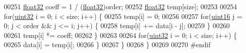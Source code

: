 \begin{DoxyCode}
00251         \hyperlink{definitions_8hpp_aacdc525d6f7bddb3ae95d5c311bd06a1}{float32} coeff = 1 / (\hyperlink{definitions_8hpp_aacdc525d6f7bddb3ae95d5c311bd06a1}{float32})order;
00252         \hyperlink{definitions_8hpp_aacdc525d6f7bddb3ae95d5c311bd06a1}{float32} temp[size];
00253 
00254         \textcolor{keywordflow}{for}(\hyperlink{definitions_8hpp_a1134b580f8da4de94ca6b1de4d37975e}{uint32} i = 0; i < size; i++) \{
00255             temp[i] = 0;
00256 
00257             \textcolor{keywordflow}{for}(\hyperlink{definitions_8hpp_a05f6b0ae8f6a6e135b0e290c25fe0e4e}{uint16} j = 0; j < order && j <= i; j++) \{
00258                 temp[i] += data[i - j];
00259             \}
00260 
00261             temp[i] *= coeff;
00262         \}
00263 
00264         \textcolor{keywordflow}{for}(\hyperlink{definitions_8hpp_a1134b580f8da4de94ca6b1de4d37975e}{uint32} i = 0; i < size; i++) \{
00265             data[i] = temp[i];
00266         \}
00267     \}
00268 \}
00269 
00270 \textcolor{preprocessor}{#endif}
\end{DoxyCode}

